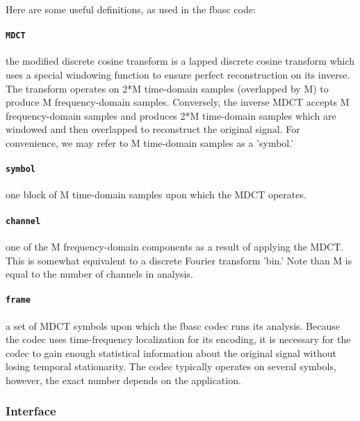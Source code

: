 Here are some useful definitions, as used in the fbasc code:

\paragraph{{\tt MDCT}}
the modified discrete cosine transform is a lapped discrete cosine
transform which uses a special windowing function to ensure perfect
reconstruction on its inverse. The transform operates on 2*M time-domain
samples (overlapped by M) to produce M frequency-domain samples.
Conversely, the inverse MDCT accepts M frequency-domain samples and
produces 2*M time-domain samples which are windowed and then overlapped to
reconstruct the original signal.  For convenience, we may refer to M
time-domain samples as a 'symbol.'

\paragraph{{\tt symbol}}
one block of M time-domain samples upon which the MDCT operates.
 
\paragraph{{\tt channel}}
one of the M frequency-domain components as a result of applying the
MDCT.  This is somewhat equivalent to a discrete Fourier transform 'bin.'
Note than M is equal to the number of channels in analysis.

\paragraph{{\tt frame}}
a set of MDCT symbols upon which the fbasc codec runs its analysis.
Because the codec uses time-frequency localization for its encoding, it is
necessary for the codec to gain enough statistical information about the
original signal without losing temporal stationarity. The codec typically
operates on several symbols, however, the exact number depends on the
application.

\subsubsection{Interface}
